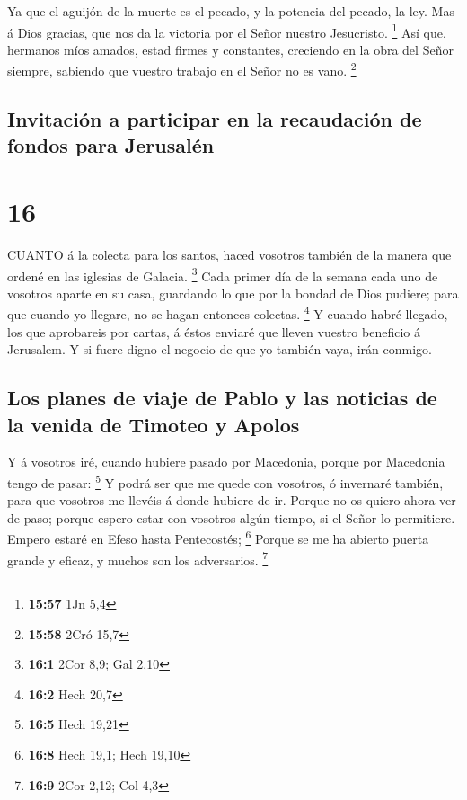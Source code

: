  Ya que el aguijón de la muerte es el pecado, y la potencia
del pecado, la ley.  Mas á Dios gracias, que nos da la
victoria por el Señor nuestro Jesucristo. \footnote{\textbf{15:57} 1Jn
  5,4}  Así que, hermanos míos amados, estad firmes y
constantes, creciendo en la obra del Señor siempre, sabiendo que vuestro
trabajo en el Señor no es vano. \footnote{\textbf{15:58} 2Cró 15,7}

\hypertarget{invitaciuxf3n-a-participar-en-la-recaudaciuxf3n-de-fondos-para-jerusaluxe9n}{%
\subsection{Invitación a participar en la recaudación de fondos para
Jerusalén}\label{invitaciuxf3n-a-participar-en-la-recaudaciuxf3n-de-fondos-para-jerusaluxe9n}}

\hypertarget{section-15}{%
\section{16}\label{section-15}}

 CUANTO á la colecta para los santos, haced vosotros también
de la manera que ordené en las iglesias de Galacia. \footnote{\textbf{16:1}
  2Cor 8,9; Gal 2,10}  Cada primer día de la semana cada uno
de vosotros aparte en su casa, guardando lo que por la bondad de Dios
pudiere; para que cuando yo llegare, no se hagan entonces colectas.
\footnote{\textbf{16:2} Hech 20,7}  Y cuando habré llegado,
los que aprobareis por cartas, á éstos enviaré que lleven vuestro
beneficio á Jerusalem.  Y si fuere digno el negocio de que
yo también vaya, irán conmigo.

\hypertarget{los-planes-de-viaje-de-pablo-y-las-noticias-de-la-venida-de-timoteo-y-apolos}{%
\subsection{Los planes de viaje de Pablo y las noticias de la venida de
Timoteo y
Apolos}\label{los-planes-de-viaje-de-pablo-y-las-noticias-de-la-venida-de-timoteo-y-apolos}}

 Y á vosotros iré, cuando hubiere pasado por Macedonia,
porque por Macedonia tengo de pasar: \footnote{\textbf{16:5} Hech 19,21}
 Y podrá ser que me quede con vosotros, ó invernaré también,
para que vosotros me llevéis á donde hubiere de ir.  Porque
no os quiero ahora ver de paso; porque espero estar con vosotros algún
tiempo, si el Señor lo permitiere.  Empero estaré en Efeso
hasta Pentecostés; \footnote{\textbf{16:8} Hech 19,1; Hech 19,10}
 Porque se me ha abierto puerta grande y eficaz, y muchos
son los adversarios. \footnote{\textbf{16:9} 2Cor 2,12; Col 4,3}

